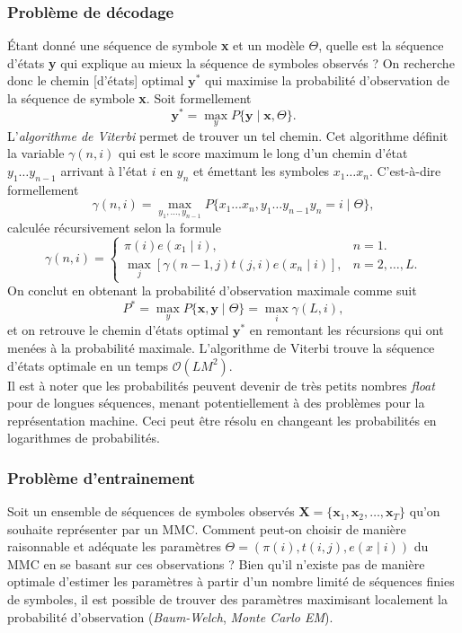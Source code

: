 \documentclass[a4paper, 11pt]{article}
\newcommand{\pinit}{\pi (i)}
\newcommand{\ptrans}{t(i,j)}
\newcommand{\pemi}{e(x\mid i)}
\begin{document}
\subsubsection{Problème de décodage}
Étant donné une séquence de symbole \textbf{x} et un modèle $\Theta$, quelle est la séquence d'états \textbf{y} qui explique au mieux la séquence de symboles observés ? On recherche donc le chemin [d'états] optimal $\textbf{y}^*$ qui maximise la probabilité d'observation de la séquence de symbole \textbf{x}. Soit formellement
\begin{equation}
\textbf{y}^*=\max_y P\{\textbf{y}\mid \textbf{x},\Theta\}.
\end{equation}
L'\textit{algorithme de Viterbi} permet de trouver un tel chemin. Cet algorithme définit la variable $\gamma (n,i)$ qui est le score maximum le long d'un chemin d'état $y_1\dotsc y_{n-1}$ arrivant à l'état $i$ en $y_n$ et émettant les symboles $x_1\dotsc x_n$. C'est-à-dire formellement
\begin{equation}
\gamma (n,i) = \max_{y_1,\dotsc ,y_{n-1}}P\{x_1\dotsc x_n,y_1\dotsc y_{n-1}y_n=i\mid\Theta\},
\end{equation}
calculée récursivement selon la formule
\begin{equation}
\gamma (n,i) = \begin{cases}
	\pi (i)e(x_1\mid i), & n=1.\\
	\max\limits_{j}[\gamma (n-1,j)t(j,i)e(x_{n}\mid i)], & n=2,\dotsc ,L.
\end{cases}
\end{equation}
On conclut en obtenant la probabilité d'observation maximale comme suit
\begin{equation}
P^*= \max_y P\{\textbf{x},\textbf{y}\mid\Theta\}= \max_i \gamma (L,i),
\end{equation}
et on retrouve le chemin d'états optimal $\textbf{y}^*$ en remontant les récursions qui ont menées à la probabilité maximale. L'algorithme de Viterbi trouve la séquence d'états optimale en un temps $\mathcal{O}(LM^2)$.
\\
Il est à noter que les probabilités peuvent devenir de très petits nombres \textit{float} pour de longues séquences, menant potentiellement à des problèmes pour la représentation machine. Ceci peut être résolu en changeant les probabilités en logarithmes de probabilités.
\subsubsection{Problème d'entrainement}
Soit un ensemble de séquences de symboles observés $\textbf{X}=\{\textbf{x}_1,\textbf{x}_2,\dotsc ,\textbf{x}_T\}$ qu'on souhaite représenter par un MMC. Comment peut-on choisir de manière raisonnable et adéquate les paramètres $\Theta = (\pinit,\ptrans,\pemi)$ du MMC en se basant sur ces observations ? Bien qu'il n'existe pas de manière optimale d'estimer les paramètres à partir d'un nombre limité de séquences finies de symboles, il est possible de trouver des paramètres maximisant localement la probabilité d'observation (\textit{Baum-Welch}, \textit{Monte Carlo EM}).
\end{document}
